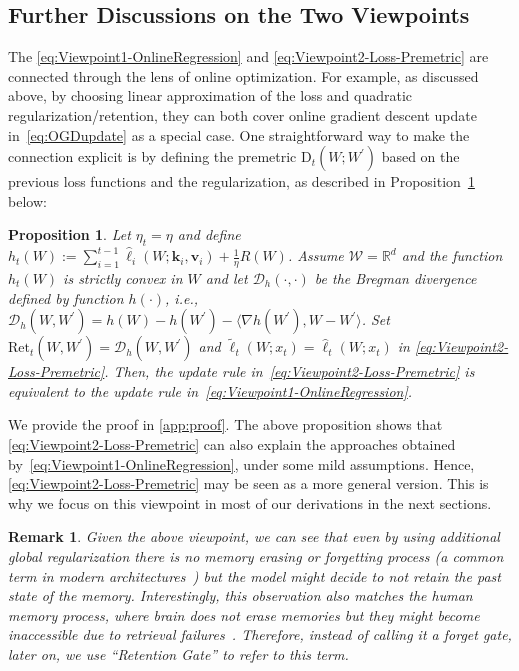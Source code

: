 \documentclass{article}
\newcommand{\citep}{\parencite}
\newcommand{\vk}[0]{\mathbf{k}}
\newcommand{\vvv}[0]{\mathbf{v}}
\newcommand{\cW}[0]{\mathcal{W}}
\newtheorem{remark}{Remark}
\theoremstyle{plain}
\newtheorem{proposition}[theorem]{Proposition}
\theoremstyle{definition}
\theoremstyle{remark}
\begin{document}
\subsection{Further Discussions on the Two Viewpoints}
The \eqref{eq:Viewpoint1-OnlineRegression} and \eqref{eq:Viewpoint2-Loss-Premetric} are connected through the lens of online optimization. For example, as discussed above, by choosing linear approximation of the loss and quadratic regularization/retention, they can both cover online gradient descent update in~\eqref{eq:OGDupdate} as a special case.  One straightforward way to make the connection  explicit is by defining the premetric $\mbox{D}_t(W;W^\prime)$ based on the previous loss functions and the regularization, as described in Proposition~\ref{prop:Viewpoint1Implies2} below:
\begin{proposition}
\label{prop:Viewpoint1Implies2}
 Let $\eta_t = \eta$ and define~$h_t(W) :=  \sum_{i=1}^{t-1} \widehat{\ell}_i (W;\vk_i,\vvv_i) + \frac{1}{\eta}R(W)$. Assume $\cW = \mathbb{R}^d$ and the function $h_t(W)$ is strictly convex in $W$ and let $\mathcal{D}_h(\cdot,\cdot)$ be the Bregman divergence defined by function $h(\cdot)$, i.e., $\mathcal{D}_h(W,W^\prime) = h(W) - h(W^\prime) - \langle \nabla h(W^{\prime}), W-W^{\prime}\rangle$. Set $\mbox{Ret}_t(W,W^\prime) = \mathcal{D}_h(W,W^\prime)$ and $\widetilde{\ell}_t(W;x_t) = \widehat{\ell}_t(W;x_t)$ in \eqref{eq:Viewpoint2-Loss-Premetric}. Then, the update rule in~\eqref{eq:Viewpoint2-Loss-Premetric} is equivalent to the update rule in~\eqref{eq:Viewpoint1-OnlineRegression}. 
\end{proposition} 
We provide the proof in \autoref{app:proof}. The above proposition shows that \eqref{eq:Viewpoint2-Loss-Premetric} can also explain the approaches obtained by~\eqref{eq:Viewpoint1-OnlineRegression}, under some mild assumptions. Hence, \eqref{eq:Viewpoint2-Loss-Premetric} may be seen as a more general version. This is why we focus on this viewpoint in most of our derivations in the next sections. 



\begin{remark}
Given the above viewpoint, we can see that even by using additional global regularization there is no memory erasing or forgetting process (a common term in modern architectures~\citep{behrouz2024titans, yang2024gated}) but the model might decide to not retain the past state of the memory. Interestingly, this observation also matches the human memory process, where brain does not erase memories but they might become inaccessible due to retrieval failures~\citep{robertson2002memory}. Therefore, instead of calling it a forget gate, later on, we use ``Retention Gate'' to refer to this term.  
\end{remark}
\end{document}
